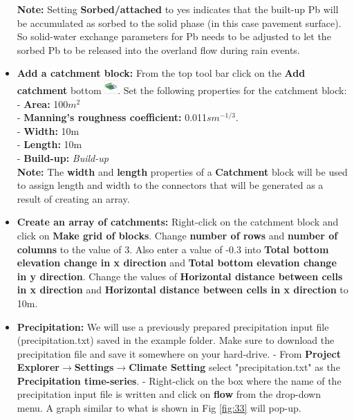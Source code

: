 \begin{itemize}
    \textbf{Note: } Setting \textbf{Sorbed/attached} to yes indicates that the built-up Pb will be accumulated as sorbed to the solid phase (in this case pavement surface). So  solid-water exchange parameters for Pb needs to be adjusted to let the sorbed Pb to be released into the overland flow during rain events. \\
    \item \textbf{Add a catchment block: } From the top tool bar click on the \textbf{Add catchment} bottom \includegraphics[width=0.5cm]{Icons/catchment_icon.png}. Set the following properties for the catchment block: \\
    - \textbf{Area: } 100$m^2$ \\
    - \textbf{Manning's roughness coefficient: } 0.011$s  m^{-1/3}$. \\
    - \textbf{Width: } 10m \\
    - \textbf{Length: } 10m \\
    - \textbf{Build-up: } \textit{Build-up} \\
    \textbf{Note: } The \textbf{width} and \textbf{length} properties of a \textbf{Catchment} block will be used to assign length and width to the connectors that will be generated as a result of creating an array. 
   \item \textbf{Create an array of catchments: } Right-click on the catchment block and click on \textbf{Make grid of blocks}. Change \textbf{number of rows} and \textbf{number of columns} to the value of 3. Also enter a value of -0.3 into \textbf{Total bottom elevation change in x direction} and \textbf{Total bottom elevation change in y direction}. Change the values of \textbf{Horizontal distance between cells in x direction} and \textbf{Horizontal distance between cells in x direction} to 10m. 
   \item \textbf{Precipitation: } We will use a previously prepared precipitation input file (precipitation.txt) saved in the example folder. Make sure to download the precipitation file and save it somewhere on your hard-drive. 
   - From \textbf{Project Explorer}$\rightarrow$\textbf{Settings}$\rightarrow$\textbf{Climate Setting} select "precipitation.txt" as the \textbf{Precipitation time-series}. 
   - Right-click on the box where the name of the precipitation input file is written and click on \textbf{flow} from the drop-down menu. A graph similar to what is shown in Fig \ref{fig:33} will pop-up. 
   

\end{itemize}
